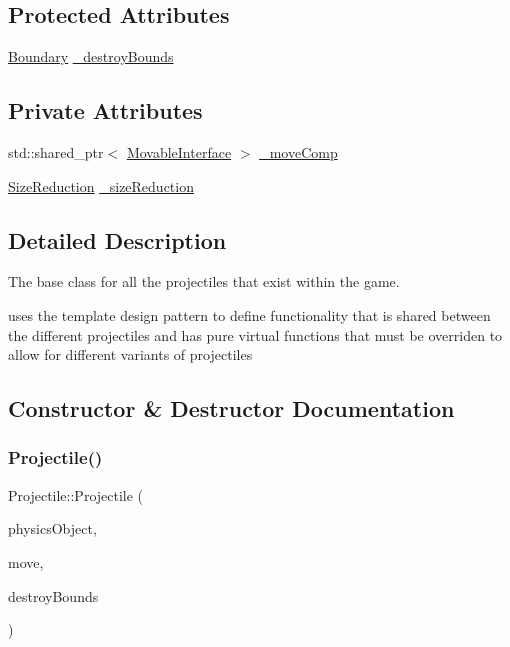 \subsection*{Protected Attributes}
\begin{DoxyCompactItemize}
\item 
\hyperlink{class_boundary}{Boundary} \hyperlink{class_projectile_a2904a8119d6703c781e4d54c345b75b7}{\+\_\+destroy\+Bounds}
\end{DoxyCompactItemize}
\subsection*{Private Attributes}
\begin{DoxyCompactItemize}
\item 
std\+::shared\+\_\+ptr$<$ \hyperlink{class_movable_interface}{Movable\+Interface} $>$ \hyperlink{class_projectile_afd6f6c2b3c202adb129a9cbfcd62ea1f}{\+\_\+move\+Comp}
\item 
\hyperlink{class_size_reduction}{Size\+Reduction} \hyperlink{class_projectile_adaf2c52cd2491197174be5a5faeca052}{\+\_\+size\+Reduction}
\end{DoxyCompactItemize}


\subsection{Detailed Description}
The base class for all the projectiles that exist within the game. 

uses the template design pattern to define functionality that is shared between the different projectiles and has pure virtual functions that must be overriden to allow for different variants of projectiles 

\subsection{Constructor \& Destructor Documentation}
\mbox{\label{class_projectile_a4ff1ec79a15e7821ac5ccfd6dda9205f}} 
\subsubsection{\texorpdfstring{Projectile()}{Projectile()}}
{\footnotesize\ttfamily Projectile\+::\+Projectile (\begin{DoxyParamCaption}\item[{const \hyperlink{class_physics_object}{Physics\+Object} \&}]{physics\+Object,  }\item[{const std\+::shared\+\_\+ptr$<$ \hyperlink{class_movable_interface}{Movable\+Interface} $>$ \&}]{move,  }\item[{const \hyperlink{class_boundary}{Boundary} \&}]{destroy\+Bounds }\end{DoxyParamCaption})}



